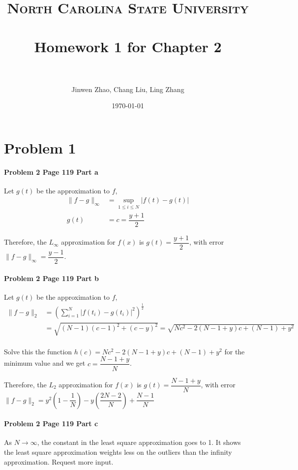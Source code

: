 \documentclass[paper=a4, fontsize=11pt]{scrartcl} %
\title{	
\normalfont \normalsize
\textsc{North Carolina State University} \\ [25pt] %
\horrule{0.5pt} \\[0.4cm] %
\huge Homework 1 for Chapter 2 \\ %
\horrule{2pt} \\[0.5cm] %
}
\author{Jinwen Zhao, Chang Liu, Ling Zhang} %
\date{\normalsize\today} %
\numberwithin{equation}{section} %
\numberwithin{figure}{section} %
\numberwithin{table}{section} %
\begin{document}
\maketitle %


\section*{Problem 1}
\paragraph{\textbf{Problem 2 Page 119 Part a}} Let $ g(t) $ be the approximation to $ f $,
\begin{align*}
	\|f-g\|_{\infty}&=\sup_{1\leq i\leq N} | f(t)-g(t)|\\
	g(t)&=c=\dfrac{y+1}{2}
\end{align*}

Therefore, the $L_\infty$ approximation for $f(x)$ is $g(t) = \dfrac{y+1}{2}$, with error $ \|f-g\|_{\infty}=\dfrac{y-1}{2} $.

\paragraph{\textbf{Problem 2 Page 119 Part b}} Let $ g(t) $ be the approximation to $ f $,
\begin{align*}
	\|f-g\|_2&=({\sum_{i=1}^{N}|f(t_i)-g(t_i)|^{2}} )^{\frac{1}{2}}\\
			&=\sqrt{(N-1)(c-1)^2+(c-y)^2} = \sqrt{Nc^2-2(N-1+y)c+(N-1)+y^2}
\end{align*}\\
Solve this the function $ h(c)=Nc^2-2(N-1+y)c+(N-1)+y^2 $ for the minimum value and we get $ c=\dfrac{N-1+y}{N} $.

Therefore, the $L_2$ approximation for $f(x)$ is $g(t) = \dfrac{N-1+y}{N}$,  with error $ \|f-g\|_2=y^2(1-\dfrac{1}{N})-y(\dfrac{2N-2}{N})+\dfrac{N-1}{N} $

\paragraph{\textbf{Problem 2 Page 119 Part c}} As $ N\rightarrow \infty $, the constant in the least square approximation goes to 1. It shows the least square approximation weights less on the outliers than the infinity approximation. Request more input.
\end{document}
